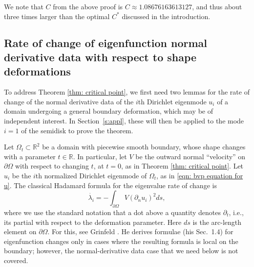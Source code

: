 \documentclass{amsart}
\newcommand{\be}{\begin{equation}}
\newcommand{\ee}{\end{equation}}
\newcommand{\mbf}[1]{{\mathbf #1}}
\newcommand{\R}{\mathbb{R}}
\newcommand{\s}{\mbf{s}}
\newcommand{\pO}{{\partial\Omega}}
\newcommand{\dn}{{\partial_n}}
\theoremstyle{plain}
\begin{document}
We note that $C$ from the above proof is $C \approx 1.08676163613127$,
and thus about three times larger than the optimal $C^*$ discussed
in the introduction.





\subsection{Rate of change of eigenfunction normal derivative data with respect to
  shape deformations}
\label{s:deform}

To address Theorem \ref{thm: critical point},
we first need two lemmas for the rate of change of the normal derivative
data of the $i$th Dirichlet eigenmode $u_i$ of a domain
undergoing a general boundary deformation, which may be of independent interest.
In Section~\ref{s:appl},
these will then be applied to the mode $i=1$ of the semidisk to prove
the theorem.

Let $\Omega_t\subset\R^2$ be a domain with piecewise smooth boundary,
whose shape changes with a 
parameter $t\in\R$.
In particular, let $V$ be the outward normal ``velocity'' on $\pO$ with respect to
changing $t$, at $t=0$,
as in Theorem \ref{thm: critical point}.
Let $u_i$ be the $i$th normalized Dirichlet eigenmode of $\Omega_t$,
as in \eqref{eqn: bvp equation for u}.
The classical Hadamard formula for the eigenvalue rate of change is
\be
\dot{\lambda_i} = -\int_\pO V (\dn u_i)^2 ds,
\label{had}
\ee
where we use the standard notation that a dot above a quantity denotes
$\partial_t$, i.e., its partial with respect to the deformation parameter.
Here $ds$ is the arc-length element on $\pO$.
For this, see Grinfeld \cite{grin10}. %
He derives formulae (his Sec.~1.4) for
eigenfunction changes only in cases where the resulting
formula is local on the boundary; however, the normal-derivative data
case that we need below is not covered.
\end{document}
